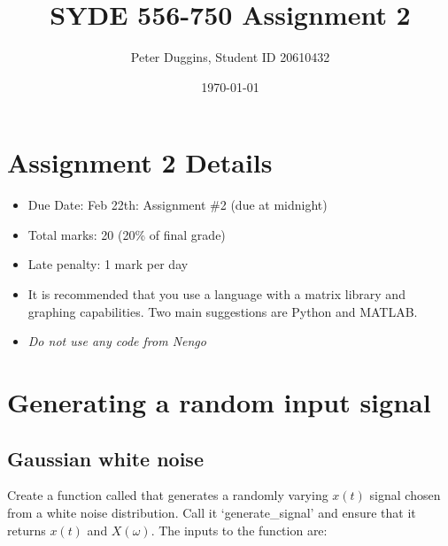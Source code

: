 \documentclass{article}
\title{SYDE 556-750 Assignment 2}
\author{Peter Duggins, Student ID 20610432}
\date{\today}
\begin{document}
\maketitle

\section*{Assignment 2 Details}\label{syde556750-assignment-2-spiking-neurons}

\begin{itemize}
\itemsep1pt\parskip0pt
\item
  Due Date: Feb 22th: Assignment \#2 (due at midnight)
\item
  Total marks: 20 (20\% of final grade)
\item
  Late penalty: 1 mark per day
\item
  It is recommended that you use a language with a matrix library and
  graphing capabilities. Two main suggestions are Python and MATLAB.
\item
  \emph{Do not use any code from Nengo}
\end{itemize}

\section{Generating a random input signal}\label{generating-a-random-input-signal}

\subsection{Gaussian white noise}\label{gaussian-white-noise}

Create a function called that generates a randomly varying $x(t)$ signal
chosen from a white noise distribution. Call it `generate\_signal' and
ensure that it returns $x(t)$ and $X(\omega)$. The inputs to the
function are:
\end{document}

